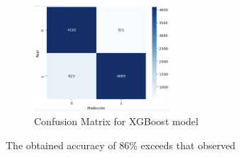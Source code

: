 \begin{figure}[H]
    \centering
    \includegraphics[width=0.45\textwidth]{images/confusion_matrix_xgboots.png} 
    \caption{Confusion Matrix for XGBoost model}
    \label{fig:confusion_matrix_xgboost}
\end{figure}

The obtained accuracy of 86\% exceeds that observed